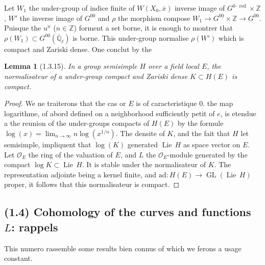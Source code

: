 \documentclass[12pt,a4paper]{article}
\theoremstyle{plain}
\newtheorem{lemma}[theorem]{Lemma}
\theoremstyle{definition}
\theoremstyle{definition}
\theoremstyle{remark}
\DeclareMathOperator{\GL}{GL}
\DeclareMathOperator{\Lie}{Lie}
\DeclareMathOperator{\red}{red}
\begin{document}
Let $W_1$ the under-group of indice finite of $W(X_0, \overline{x})$ inverse image of $G^{0\text{--}\red} \times \mathbb{Z}$, $W'$ the inverse image of $G^{00}$ and $\rho$ the morphism compose $W_1 \to G^{00} \times \mathbb{Z} \to G^{00}$. Puisque the $u^n$ ($n \in \mathbb{Z}$) forment a set borne, it is enough to montrer that $\rho(W_1) \subset G^{00}(\overline{\mathbb{Q}}_\ell)$ is borne. This under-group normalise $\rho(W')$ which is compact and Zariski dense. One conclut by the

\begin{lemma}[1.3.15]
In a group semisimple $H$ over a field local $E$, the normalisateur of a under-group compact and Zariski dense $K \subset H(E)$ is compact.
\end{lemma}

\begin{proof}
We ne traiterons that the cas or $E$ is of caracteristique $0$. the map logarithme, of abord defined on a neighborhood sufficiently petit of $e$, is etendue a the reunion of the under-groups compacts of $H(E)$ by the formule $\log(x) = \lim_{n \to \infty} n \log(x^{1/n})$. The densite of $K$, and the fait that $H$ let semisimple, impliquent that $\log(K)$ generated $\Lie\, H$ as space vector on $E$. Let $\mathcal{O}_E$ the ring of the valuation of $E$, and $L$ the $\mathcal{O}_E$-module generated by the compact $\log K \subset \Lie\, H$. It is stable under the normalisateur of $K$. The representation adjointe being a kernel finite, and $\text{ad}: H(E) \to \GL(\Lie\, H)$ proper, it follows that this normalisateur is compact.
\end{proof}

\newpage

\subsection*{(1.4) Cohomology of the curves and functions $L$: rappels}

This numero rassemble some results bien connus of which we ferons a usage constant.
\end{document}
